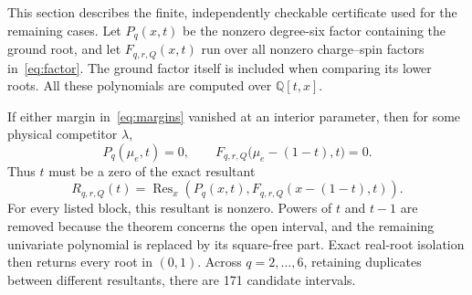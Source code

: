 \documentclass[11pt]{article}
\newcommand{\Q}{\mathbb Q}
\begin{document}
This section describes the finite, independently checkable certificate
used for the remaining cases.  Let \(P_q(x,t)\) be the nonzero degree-six
factor containing the ground root, and let \(F_{q,r,Q}(x,t)\) run over
all nonzero charge--spin factors in~\eqref{eq:factor}.  The ground factor
itself is included when comparing its lower roots.  All these polynomials
are computed over \(\Q[t,x]\).

If either margin in~\eqref{eq:margins} vanished at an interior parameter,
then for some physical competitor \(\lambda\),
\begin{equation}
 P_q(\mu_e,t)=0,
 \qquad
 F_{q,r,Q}\bigl(\mu_e-(1-t),t\bigr)=0.                \label{eq:crossing}
\end{equation}
Thus \(t\) must be a zero of the exact resultant
\begin{equation}
 R_{q,r,Q}(t)=\operatorname{Res}_x
 \left(P_q(x,t),F_{q,r,Q}(x-(1-t),t)\right).           \label{eq:res}
\end{equation}
For every listed block, this resultant is nonzero.  Powers of \(t\) and
\(t-1\) are removed because the theorem concerns the open interval, and
the remaining univariate polynomial is replaced by its square-free part.
Exact real-root isolation then returns every root in \((0,1)\).  Across
\(q=2,\ldots,6\), retaining duplicates between different resultants,
there are 171 candidate intervals.
\end{document}
